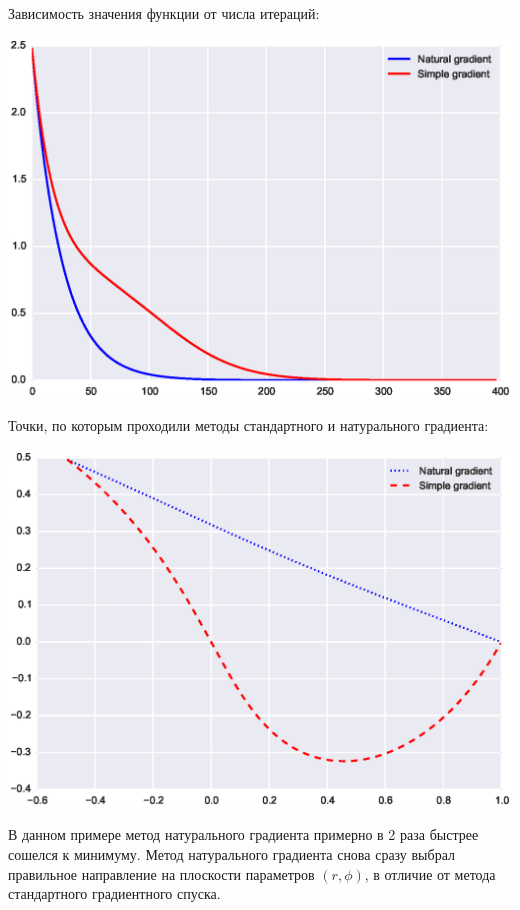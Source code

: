 \documentclass[a4paper,12pt]{article}
\begin{document}
        Зависимость значения функции от числа итераций:
        \begin{flushleft}
            \includegraphics[scale=0.8, trim=1.5cm 0 0 0]{figure_6}
        \end{flushleft}

        \newpage

        Точки, по которым проходили методы стандартного и натурального градиента:
        \begin{flushleft}
            \includegraphics[scale=0.8, trim=1.5cm 0 0 0]{figure_66}
        \end{flushleft}

        В данном примере метод натурального градиента примерно в 2 раза быстрее сошелся к минимуму.
        Метод натурального градиента снова сразу выбрал правильное направление на плоскости параметров $(r, \phi)$, 
        в отличие от метода стандартного градиентного спуска.
\end{document}
